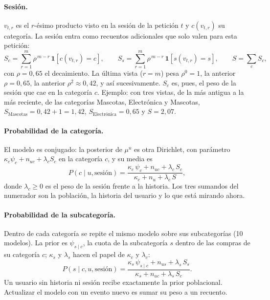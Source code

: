 \documentclass[11pt,a4paper]{article}
\begin{document}
\paragraph{Sesión.} $v_{t,r}$ es el $r$-ésimo producto visto en la sesión de la petición $t$ y
$c(v_{t,r})$ su categoría. La sesión entra como recuentos adicionales que solo valen para esta petición:
\[
S_c=\sum_{r=1}^{m}\rho^{\,m-r}\,\mathbf 1[c(v_{t,r})=c],\qquad
S_s=\sum_{r=1}^{m}\rho^{\,m-r}\,\mathbf 1[s(v_{t,r})=s],\qquad
S=\sum_c S_c ,
\]
con $\rho=0{,}65$ el decaimiento. La última vista ($r=m$) pesa $\rho^0=1$, la anterior $\rho=0{,}65$, la
anterior $\rho^2\approx0{,}42$, y así sucesivamente. $S_c$ es, pues, el peso de la sesión que cae en la
categoría $c$. Ejemplo: con tres vistas, de la más antigua a la más reciente, de las categorías
Mascotas, Electrónica y Mascotas, $S_{\text{Mascotas}}=0{,}42+1=1{,}42$,
$S_{\text{Electrónica}}=0{,}65$ y $S=2{,}07$.

\paragraph{Probabilidad de la categoría.} El modelo es conjugado: la posterior de $\mu^u$ es otra
Dirichlet, con parámetro $\kappa_c\psi_c+n_{uc}+\lambda_c S_c$ en la categoría $c$, y su media es
\begin{equation}
P(c\mid u,\text{sesión})=\frac{\kappa_c\,\psi_c+n_{uc}+\lambda_c\,S_c}{\kappa_c+n_{u}+\lambda_c\,S},
\label{eq:cat}
\end{equation}
donde $\lambda_c\ge0$ es el peso de la sesión frente a la historia. Los tres sumandos del numerador son
la población, la historia del usuario y lo que está mirando ahora.

\paragraph{Probabilidad de la subcategoría.} Dentro de cada categoría se repite el mismo modelo sobre
sus subcategorías (10 modelos). La prior es $\psi_{s\mid c}$, la cuota de la subcategoría $s$ dentro de
las compras de su categoría $c$; $\kappa_s$ y $\lambda_s$ hacen el papel de $\kappa_c$ y $\lambda_c$:
\begin{equation}
P(s\mid c,u,\text{sesión})=\frac{\kappa_s\,\psi_{s\mid c}+n_{us}+\lambda_s\,S_s}{\kappa_s+n_{uc}+\lambda_s\,S_c}.
\label{eq:sub}
\end{equation}
Un usuario sin historia ni sesión recibe exactamente la prior poblacional. Actualizar el modelo con
un evento nuevo es sumar su peso a un recuento.
\end{document}
